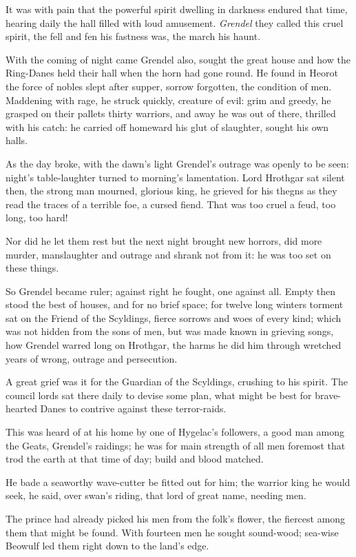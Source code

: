 \documentclass[a4paper]{article}
\begin{document}
{It was with pain that the powerful spirit
dwelling in darkness endured that time,
hearing daily the hall filled with loud amusement.
\textit{Grendel} they called this cruel spirit,
the fell and fen his fastness was, the march his haunt.

With the coming of night came Grendel also,
sought the great house and how the Ring-Danes
held their hall when the horn had gone round.
He found in Heorot the force of nobles
slept after supper, sorrow forgotten,
the condition of men. Maddening with rage,
he struck quickly, creature of evil:
grim and greedy, he grasped on their pallets
thirty warriors, and away he was out of there,
thrilled with his catch: he carried off homeward
his glut of slaughter, sought his own halls.

As the day broke, with the dawn’s light
Grendel’s outrage was openly to be seen:
night’s table-laughter turned to morning’s
lamentation. Lord Hrothgar
sat silent then, the strong man mourned,
glorious king, he grieved for his thegns
as they read the traces of a terrible foe,
a cursed fiend. That was too cruel a feud,
too long, too hard!

Nor did he let them rest
but the next night brought new horrors,
did more murder, manslaughter and outrage
and shrank not from it: he was too set on these things.

So Grendel became ruler; against right he fought,
one against all. Empty then stood
the best of houses, and for no brief space;
for twelve long winters torment sat
on the Friend of the Scyldings, fierce sorrows
and woes of every kind; which was not hidden
from the sons of men, but was made known
in grieving songs, how Grendel warred
long on Hrothgar, the harms he did him
through wretched years of wrong, outrage
and persecution.

A great grief was it for the Guardian of the Scyldings,
crushing to his spirit. The council lords
sat there daily to devise some plan,
what might be best for brave-hearted
Danes to contrive against these terror-raids.

This was heard of at his home by one of Hygelac’s followers,
a good man among the Geats, Grendel’s raidings;
he was for main strength of all men foremost
that trod the earth at that time of day;
build and blood matched.

He bade a seaworthy
wave-cutter be fitted out for him; the warrior king
he would seek, he said, over swan’s riding,
that lord of great name, needing men.

The prince had already picked his men
from the folk’s flower, the fiercest among them
that might be found. With fourteen men
he sought sound-wood; sea-wise Beowulf
led them right down to the land’s edge.

}
\end{document}
